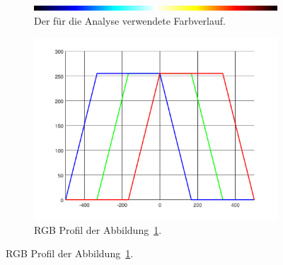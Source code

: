 \begin{figure}
	\centering
	\begin{subfigure}
		\centering
		\includegraphics[width=0.9\linewidth]{cmb/converter/converter-function-strip.png}
		\caption{Der für die Analyse verwendete Farbverlauf.}
		\label{fig:color-strip}
	\end{subfigure}
	\hfill
	\begin{subfigure}
		\centering
		\includegraphics[width=\linewidth]{cmb/converter/converter-function.pdf}
		\caption{RGB Profil der Abbildung~\ref{fig:color-strip}.}
		\label{fig:color-strip-rgb}
	\end{subfigure}
\end{figure}

